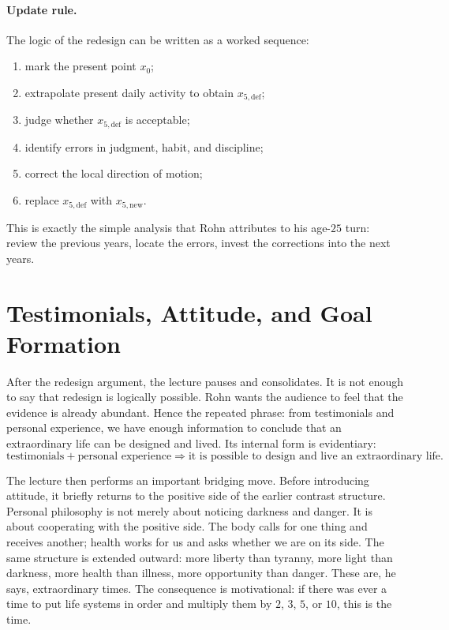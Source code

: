 \paragraph{Update rule.}
The logic of the redesign can be written as a worked sequence:
\begin{enumerate}
\item mark the present point \(x_0\);
\item extrapolate present daily activity to obtain \(x_{5,\mathrm{def}}\);
\item judge whether \(x_{5,\mathrm{def}}\) is acceptable;
\item identify errors in judgment, habit, and discipline;
\item correct the local direction of motion;
\item replace \(x_{5,\mathrm{def}}\) with \(x_{5,\mathrm{new}}\).
\end{enumerate}
This is exactly the simple analysis that Rohn attributes to his age-\(25\) turn: review the previous years, locate the errors, invest the corrections into the next years.

\section{Testimonials, Attitude, and Goal Formation}

After the redesign argument, the lecture pauses and consolidates. It is not enough to say that redesign is logically possible. Rohn wants the audience to feel that the evidence is already abundant. Hence the repeated phrase: from testimonials and personal experience, we have enough information to conclude that an extraordinary life can be designed and lived. Its internal form is evidentiary:
\begin{equation}
\text{testimonials}+\text{personal experience}
\Longrightarrow
\text{it is possible to design and live an extraordinary life}.
\end{equation}

The lecture then performs an important bridging move. Before introducing attitude, it briefly returns to the positive side of the earlier contrast structure. Personal philosophy is not merely about noticing darkness and danger. It is about cooperating with the positive side. The body calls for one thing and receives another; health works for us and asks whether we are on its side. The same structure is extended outward: more liberty than tyranny, more light than darkness, more health than illness, more opportunity than danger. These are, he says, extraordinary times. The consequence is motivational: if there was ever a time to put life systems in order and multiply them by \(2\), \(3\), \(5\), or \(10\), this is the time.

